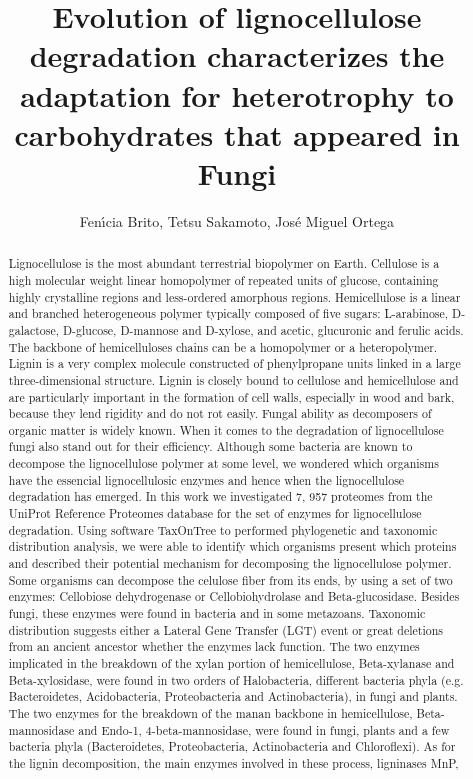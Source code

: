 \documentclass[twoside]{article}
\title{\vspace{-15mm}\fontsize{24pt}{10pt}\selectfont\textbf{ Evolution of lignocellulose degradation characterizes the adaptation for heterotrophy to carbohydrates that appeared in Fungi }} %
\author{ Fen\'{\i}cia Brito, Tetsu Sakamoto, Jos\'e Miguel Ortega }
\affil{ Universidade Federal de Minas Gerais }
\date{}
\begin{document}
  
  
  \maketitle %
  
  
  \thispagestyle{fancy} %
  
  
  \begin{abstract}
  Lignocellulose is the most abundant terrestrial biopolymer on Earth. Cellulose is a high molecular weight linear homopolymer of repeated units of glucose,  containing highly crystalline regions and less-ordered amorphous regions. Hemicellulose is a linear and branched heterogeneous polymer typically composed of five sugars: L-arabinose,  D-galactose,  D-glucose,  D-mannose and D-xylose,  and acetic,  glucuronic and ferulic acids. The backbone of hemicelluloses chains can be a homopolymer or a heteropolymer. Lignin is a very complex molecule constructed of phenylpropane units linked in a large three-dimensional structure. Lignin is closely bound to cellulose and hemicellulose and are particularly important in the formation of cell walls,  especially in wood and bark,  because they lend rigidity and do not rot easily. Fungal ability as decomposers of organic matter is widely known. When it comes to the degradation of lignocellulose fungi also stand out for their efficiency. Although some bacteria are known to decompose the lignocellulose polymer at some level,  we wondered which organisms have the essencial lignocellulosic enzymes and hence when the lignocellulose degradation has emerged. In this work we investigated 7, 957 proteomes from the UniProt Reference Proteomes database for the set of enzymes for lignocellulose degradation. Using software TaxOnTree to performed phylogenetic and taxonomic distribution analysis,  we were able to identify which organisms present which proteins and described their potential mechanism for decomposing the lignocellulose polymer. Some organisms can decompose the celulose fiber from its ends,  by using a set of two enzymes: Cellobiose dehydrogenase or Cellobiohydrolase and Beta-glucosidase. Besides fungi,  these enzymes were found in bacteria and in some metazoans. Taxonomic distribution suggests either a Lateral Gene Transfer (LGT) event or great deletions from an ancient ancestor whether the enzymes lack function. The two enzymes implicated in the breakdown of the xylan portion of hemicellulose,  Beta-xylanase and Beta-xylosidase,  were found in two orders of Halobacteria,  different bacteria phyla (e.g. Bacteroidetes,  Acidobacteria,  Proteobacteria and Actinobacteria),  in fungi and plants. The two enzymes for the breakdown of the manan backbone in hemicellulose,  Beta-mannosidase and Endo-1, 4-beta-mannosidase,  were found in fungi,  plants and a few bacteria phyla (Bacteroidetes,  Proteobacteria,  Actinobacteria and Chloroflexi). As for the lignin decomposition,  the main enzymes involved in these process,  ligninases MnP,  
\end{abstract}
\end{document}

